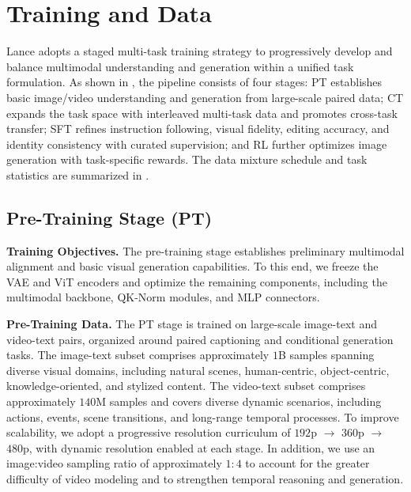 \documentclass{llmxive}
\begin{document}
\section{Training and Data}
\label{sec:training_data}

Lance adopts a staged multi-task training strategy to progressively develop and balance multimodal understanding and generation within a unified task formulation. As shown in , the pipeline consists of four stages: PT establishes basic image/video understanding and generation from large-scale paired data; CT expands the task space with interleaved multi-task data and promotes cross-task transfer; SFT refines instruction following, visual fidelity, editing accuracy, and identity consistency with curated supervision; and RL further optimizes image generation with task-specific rewards. The data mixture schedule and task statistics are summarized in .


\subsection{Pre-Training Stage (PT)}

\textbf{Training Objectives.}
The pre-training stage establishes preliminary multimodal alignment and basic visual generation capabilities. To this end, we freeze the VAE and ViT encoders and optimize the remaining components, including the multimodal backbone, QK-Norm modules, and MLP connectors.

\textbf{Pre-Training Data.}
The PT stage is trained on large-scale image-text and video-text pairs, organized around paired captioning and conditional generation tasks. The image-text subset comprises approximately $1$B samples spanning diverse visual domains, including natural scenes, human-centric, object-centric, knowledge-oriented, and stylized content. The video-text subset comprises approximately $140$M samples and covers diverse dynamic scenarios, including actions, events, scene transitions, and long-range temporal processes. 
To improve scalability, we adopt a progressive resolution curriculum of $192$p \(\rightarrow\) $360$p \(\rightarrow\) $480$p, with dynamic resolution enabled at each stage. In addition, we use an image:video sampling ratio of approximately $1:4$ to account for the greater difficulty of video modeling and to strengthen temporal reasoning and generation.

\vspace{0.5em}
\end{document}
